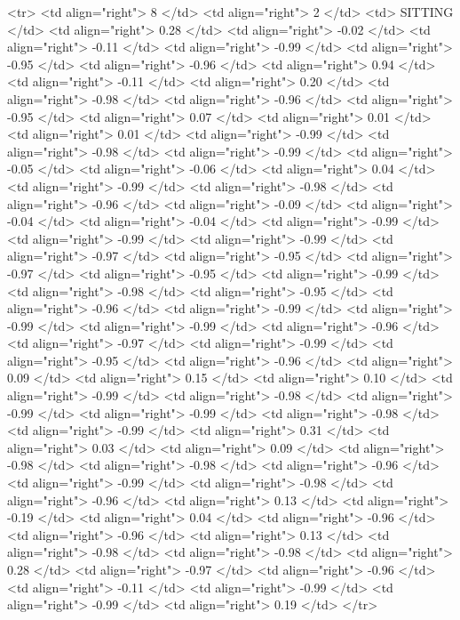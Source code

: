   <tr> <td align="right"> 8 </td> <td align="right">   2 </td> <td> SITTING </td> <td align="right"> 0.28 </td> <td align="right"> -0.02 </td> <td align="right"> -0.11 </td> <td align="right"> -0.99 </td> <td align="right"> -0.95 </td> <td align="right"> -0.96 </td> <td align="right"> 0.94 </td> <td align="right"> -0.11 </td> <td align="right"> 0.20 </td> <td align="right"> -0.98 </td> <td align="right"> -0.96 </td> <td align="right"> -0.95 </td> <td align="right"> 0.07 </td> <td align="right"> 0.01 </td> <td align="right"> 0.01 </td> <td align="right"> -0.99 </td> <td align="right"> -0.98 </td> <td align="right"> -0.99 </td> <td align="right"> -0.05 </td> <td align="right"> -0.06 </td> <td align="right"> 0.04 </td> <td align="right"> -0.99 </td> <td align="right"> -0.98 </td> <td align="right"> -0.96 </td> <td align="right"> -0.09 </td> <td align="right"> -0.04 </td> <td align="right"> -0.04 </td> <td align="right"> -0.99 </td> <td align="right"> -0.99 </td> <td align="right"> -0.99 </td> <td align="right"> -0.97 </td> <td align="right"> -0.95 </td> <td align="right"> -0.97 </td> <td align="right"> -0.95 </td> <td align="right"> -0.99 </td> <td align="right"> -0.98 </td> <td align="right"> -0.95 </td> <td align="right"> -0.96 </td> <td align="right"> -0.99 </td> <td align="right"> -0.99 </td> <td align="right"> -0.99 </td> <td align="right"> -0.96 </td> <td align="right"> -0.97 </td> <td align="right"> -0.99 </td> <td align="right"> -0.95 </td> <td align="right"> -0.96 </td> <td align="right"> 0.09 </td> <td align="right"> 0.15 </td> <td align="right"> 0.10 </td> <td align="right"> -0.99 </td> <td align="right"> -0.98 </td> <td align="right"> -0.99 </td> <td align="right"> -0.99 </td> <td align="right"> -0.98 </td> <td align="right"> -0.99 </td> <td align="right"> 0.31 </td> <td align="right"> 0.03 </td> <td align="right"> 0.09 </td> <td align="right"> -0.98 </td> <td align="right"> -0.98 </td> <td align="right"> -0.96 </td> <td align="right"> -0.99 </td> <td align="right"> -0.98 </td> <td align="right"> -0.96 </td> <td align="right"> 0.13 </td> <td align="right"> -0.19 </td> <td align="right"> 0.04 </td> <td align="right"> -0.96 </td> <td align="right"> -0.96 </td> <td align="right"> 0.13 </td> <td align="right"> -0.98 </td> <td align="right"> -0.98 </td> <td align="right"> 0.28 </td> <td align="right"> -0.97 </td> <td align="right"> -0.96 </td> <td align="right"> -0.11 </td> <td align="right"> -0.99 </td> <td align="right"> -0.99 </td> <td align="right"> 0.19 </td> </tr>
